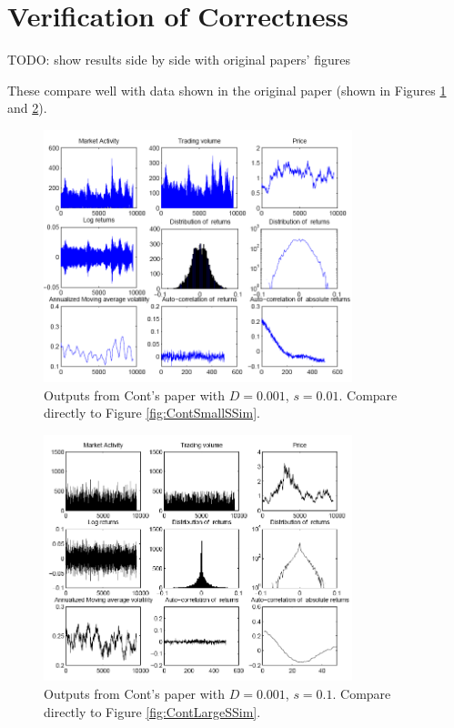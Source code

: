 \documentclass[runningheads]{llncs}
\begin{document}
\section{Verification of Correctness}

TODO: show results side by side with original papers' figures

These compare well with data shown in the original paper (shown in Figures \ref{fig:ContSmallSPap} and \ref{fig:ContLargeSPap}).


\begin{figure}[htbp]
  \begin{center}
    \includegraphics[width=0.8\textwidth]{../graphics/Cont-Fig3.png}
    \caption{Outputs from Cont's paper with $D=0.001$, $s=0.01$. Compare directly to Figure \ref{fig:ContSmallSSim}.}
    \label{fig:ContSmallSPap}
  \end{center}
\end{figure}

\begin{figure}[htbp]
  \begin{center}
    \includegraphics[width=0.8\textwidth]{../graphics/Cont-Fig4.png}
    \caption{Outputs from Cont's paper with $D=0.001$, $s=0.1$. Compare directly to Figure \ref{fig:ContLargeSSim}.}
    \label{fig:ContLargeSPap}
  \end{center}
\end{figure}
\end{document}
